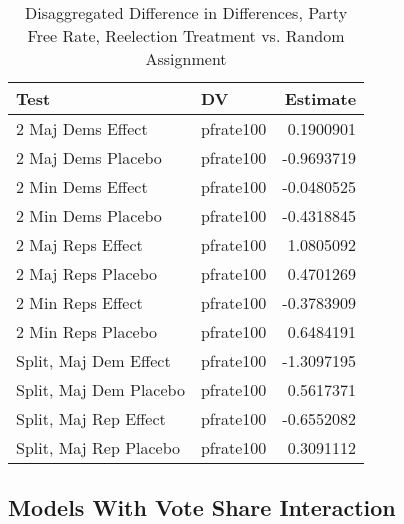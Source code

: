 \documentclass[12pt]{article}
\begin{document}
\begin{table}
	\centering
	\caption{Disaggregated Difference in Differences, Party Free Rate, Reelection Treatment vs. Random Assignment}
	\begin{tabular}{llr}
		\hline
		Test & DV & Estimate \\  
		\hline
		2 Maj Dems Effect & pfrate100 & 0.1900901 \\ 
		2 Maj Dems Placebo & pfrate100 & -0.9693719 \\ 
		2 Min Dems Effect & pfrate100 & -0.0480525 \\ 
		2 Min Dems Placebo & pfrate100 & -0.4318845 \\ 
		2 Maj Reps Effect & pfrate100 & 1.0805092 \\ 
		2 Maj Reps Placebo & pfrate100 & 0.4701269 \\ 
		2 Min Reps Effect & pfrate100 & -0.3783909 \\ 
		2 Min Reps Placebo & pfrate100 & 0.6484191 \\ 
		Split, Maj Dem Effect & pfrate100 & -1.3097195 \\ 
		Split, Maj Dem Placebo & pfrate100 & 0.5617371 \\ 
		Split, Maj Rep Effect & pfrate100 & -0.6552082 \\ 
		Split, Maj Rep Placebo & pfrate100 & 0.3091112 \\ 
		\hline
	\end{tabular}
\end{table}

\pagebreak

\subsection{Models With Vote Share Interaction}
\end{document}
